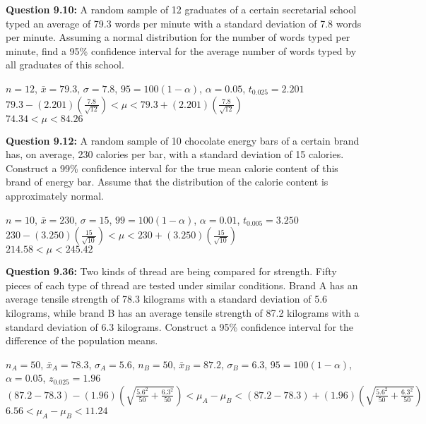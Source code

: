 \documentclass{article}
\begin{document}
\textbf{Question 9.10:}
A random sample of 12 graduates of a certain
secretarial school typed an average of 79.3 words per
minute with a standard deviation of 7.8 words per
minute. Assuming a normal distribution for the number 
of words typed per minute, find a 95\% confidence
interval for the average number of words typed by all
graduates of this school.
\begin{description}
    \item $n = 12$, $\bar{x} = 79.3$, $\sigma = 7.8$, $95 = 100(1-\alpha)$, 
    $\alpha=0.05$, $t_{0.025}=2.201$\\
    $79.3 - (2.201)(\frac{7.8}{\sqrt{12}}) < \mu < 79.3 + (2.201)(\frac{7.8}
    {\sqrt{12}})$\\\boldmath$74.34 < \mu < 84.26$
\end{description}
\textbf{Question 9.12:}
A random sample of 10 chocolate energy bars of
a certain brand has, on average, 230 calories per bar,
with a standard deviation of 15 calories. Construct a
99\% confidence interval for the true mean calorie 
content of this brand of energy bar. Assume that the 
distribution of the calorie content is approximately 
normal.
\begin{description}
    \item $n=10$, $\bar{x}=230$, $\sigma=15$, $99=100(1-\alpha)$, $\alpha=0.01$,
    $t_{0.005}=3.250$\\ $230-(3.250)(\frac{15}{\sqrt{10}}) < \mu < 230+(3.250)
    (\frac{15}{\sqrt{10}})$\\\boldmath$214.58 < \mu < 245.42$
\end{description}
\textbf{Question 9.36:}
Two kinds of thread are being compared for
strength. Fifty pieces of each type of thread are tested
under similar conditions. Brand A has an average 
tensile strength of 78.3 kilograms with a standard 
deviation of 5.6 kilograms, while brand B has an average
tensile strength of 87.2 kilograms with a standard 
deviation of 6.3 kilograms. Construct a 95\% confidence
interval for the difference of the population means.
\begin{description}
    \item $n_A=50$, $\bar{x}_A=78.3$, $\sigma_A=5.6$, $n_B=50$, $\bar{x}_B=87.2$, 
    $\sigma_B=6.3$, $95 = 100(1-\alpha)$, $\alpha = 0.05$, $z_{0.025}=1.96$\\
    $(87.2-78.3)-(1.96)(\sqrt{\frac{5.6^2}{50}+\frac{6.3^2}{50}}) < \mu_A - \mu_B
    < (87.2-78.3)+(1.96)(\sqrt{\frac{5.6^2}{50}+\frac{6.3^2}{50}})$\\
    \boldmath$6.56 < \mu_A - \mu_B < 11.24$
\end{description}
\end{document}
